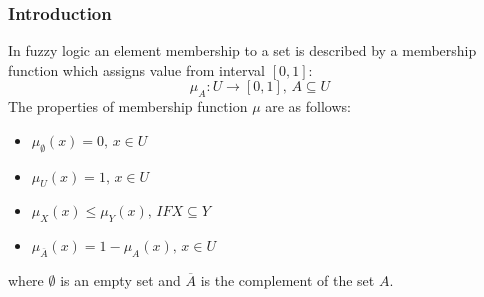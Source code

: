 \subsubsection{Introduction}
In fuzzy logic an element membership to a set is described by a membership function 
which assigns value from interval $[0, 1]$:
\begin{equation}
    \mu_A:U\rightarrow [0,1], \, A \subseteq U
    \label{eq:fuzzy_function}
\end{equation}
The properties of membership function $\mu$ are as follows:
\begin{itemize}
    \item $\mu_{\emptyset}(x) = 0, \, x \in U$
    \item  $\mu_{U}(x) = 1, \, x \in U$
    \item  $\mu_{X}(x) \leq \mu_{Y}(x), \, IF X \subseteq Y$
    \item  $\mu_{\overline{A}}(x) = 1 - \mu_{A}(x), \, x \in U$
\end{itemize}
where $\emptyset$ is an empty set and $\overline{A}$ is the complement of the
set $A$.

